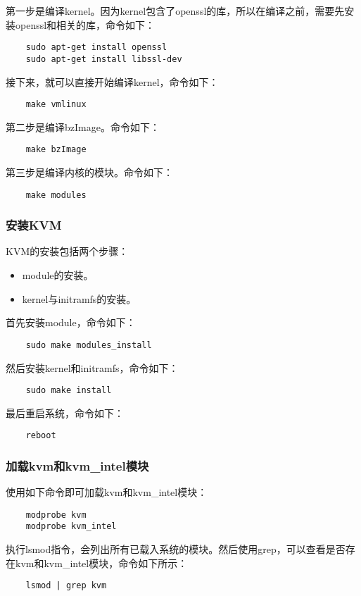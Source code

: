 \documentclass[a4paper,left=2.5cm,right=2.5cm,11pt]{article}
\begin{document}
	第一步是编译kernel。因为kernel包含了openssl的库，所以在编译之前，需要先安装openssl和相关的库，命令如下：
	\begin{lstlisting}
	sudo apt-get install openssl
	sudo apt-get install libssl-dev
	\end{lstlisting}
	
	接下来，就可以直接开始编译kernel，命令如下：
	\begin{lstlisting}
	make vmlinux
	\end{lstlisting}

	第二步是编译bzImage。命令如下：
	\begin{lstlisting}
	make bzImage
	\end{lstlisting}

	第三步是编译内核的模块。命令如下：
	\begin{lstlisting}
	make modules
	\end{lstlisting}

\subsubsection{安装KVM}
	KVM的安装包括两个步骤：
	\begin{itemize}
		\item module的安装。
		\item kernel与initramfs的安装。
	\end{itemize}

	首先安装module，命令如下：
	\begin{lstlisting}
	sudo make modules_install
	\end{lstlisting}

	然后安装kernel和initramfs，命令如下：
	\begin{lstlisting}
	sudo make install
	\end{lstlisting}

	最后重启系统，命令如下：
	\begin{lstlisting}
	reboot
	\end{lstlisting}

\subsubsection{加载kvm和kvm\_intel模块}
	使用如下命令即可加载kvm和kvm\_intel模块：
	\begin{lstlisting}
	modprobe kvm
	modprobe kvm_intel
	\end{lstlisting}

	执行lsmod指令，会列出所有已载入系统的模块。然后使用grep，可以查看是否存在kvm和kvm\_intel模块，命令如下所示：
	\begin{lstlisting}
	lsmod | grep kvm
	\end{lstlisting}
\end{document}
